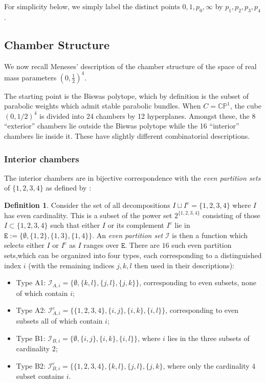 \documentclass[12pt,letterpaper,reqno]{amsart}
\theoremstyle{remark}
\theoremstyle{definition}
\newtheorem{defn}[thm]{Definition}
\numberwithin{thm}{section}
\numberwithin{equation}{section}
\numberwithin{figure}{section}
\newcommand{\CP}{\ensuremath{\mathbb {CP}}}
\begin{document}
\medskip

For simplicity below, we simply label the distinct points $0, 1, p_0, \infty$ by $p_1, p_2, p_3, p_4$. 

\subsection{Chamber Structure}\label{sec:chambers}  We now recall Meneses' \cite{Meneses} description of the chamber structure of the space of 
real mass parameters $(0, \frac{1}{2})^4$. 

The starting point is the Biswas polytope, which by definition is the subset of parabolic weights which admit stable parabolic bundles.  When $C=\CP^1$, 
the cube $(0,1/2)^4$ is divided into 24 chambers by 12 hyperplanes. Amongst these, the $8$ ``exterior'' chambers lie outside the Biswas polytope
while the 16 ``interior'' chambers lie inside it.  These have slightly different combinatorial descriptions.


\subsubsection{Interior chambers}\label{sec:interiorchambers} 
The interior chambers are in bijective correspondence with the {\it even partition sets} of $\{1,2,3,4\}$ as
defined by \cite[Definition 1]{Meneses}: 
\begin{defn}
Consider the set of all decompositions $I \sqcup I^c = \{1,2,3,4\}$ where $I$ has even cardinality. This is a subset of the power set $2^{\{1,2,3,4\}}$
consisting of those $I \subset \{1,2,3,4\}$ such that either $I$ or its complement $I^c$ lie in $\mathtt E := \{\emptyset, \{1,2\}, \{1,3\}, \{1,4\} \}$.  
An \emph{even partition set} $\mathcal{I}$ is then a function which selects either $I$ or $I^c$ as $I$ ranges over $\mathtt E$. 
There are $16$ such even partition sets,which can be organized into four types, each corresponding to a distinguished index $i$ (with 
the remaining indices $j, k, l$ then used in their descriptions):
\begin{itemize}
\item Type A1: $\mathcal{I}_{A, i}=\{\emptyset, \{k,l\}, \{j,l\}, \{j,k\}\}$, corresponding to even subsets, none of which contain $i$;
\item Type A2: $\mathcal{I}_{A, i}^c=\{\{1, 2, 3, 4\}, \{i,j\}, \{i,k\}, \{i,l\}\}$, corresponding to even subsets all of which contain $i$;
\item Type B1: $\mathcal{I}_{B, i}=\{\emptyset, \{i,j\}, \{i,k\}, \{i,l\}\}$, where $i$ lies in the three subsets of cardinality $2$;
\item Type B2: $\mathcal{I}_{B, i}^c=\{ \{1, 2, 3, 4\}, \{k,l\}, \{j,l\}, \{j,k\}$, where only the cardinality $4$ subset contains $i$.
\end{itemize}
\end{defn}
\end{document}
